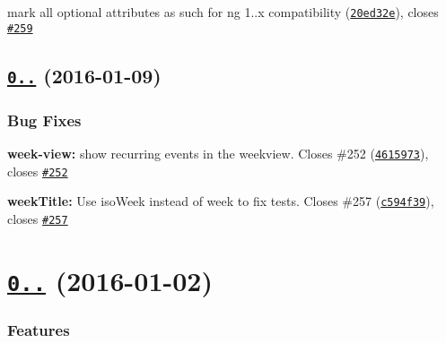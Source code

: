 \begin{DoxyItemize}
\item mark all optional attributes as such for ng 1..\+x compatibility (\href{https://github.com/mattlewis92/angular-bootstrap-calendar/commit/20ed32e}{\tt 20ed32e}), closes \href{https://github.com/mattlewis92/angular-bootstrap-calendar/issues/259}{\tt \#259}
\end{DoxyItemize}

\label{_0.18.1}%
 \subsection*{\href{https://github.com/mattlewis92/angular-bootstrap-calendar/compare/0.18.0...v0.18.1}{\tt 0..} (2016-\/01-\/09)}

\subsubsection*{Bug Fixes}


\begin{DoxyItemize}
\item {\bfseries week-\/view\+:} show recurring events in the weekview. Closes \#252 (\href{https://github.com/mattlewis92/angular-bootstrap-calendar/commit/4615973}{\tt 4615973}), closes \href{https://github.com/mattlewis92/angular-bootstrap-calendar/issues/252}{\tt \#252}
\item {\bfseries week\+Title\+:} Use iso\+Week instead of week to fix tests. Closes \#257 (\href{https://github.com/mattlewis92/angular-bootstrap-calendar/commit/c594f39}{\tt c594f39}), closes \href{https://github.com/mattlewis92/angular-bootstrap-calendar/issues/257}{\tt \#257}
\end{DoxyItemize}

\label{_0.18.0}%
 \section*{\href{https://github.com/mattlewis92/angular-bootstrap-calendar/compare/0.17.6...v0.18.0}{\tt 0..} (2016-\/01-\/02)}

\subsubsection*{Features}


